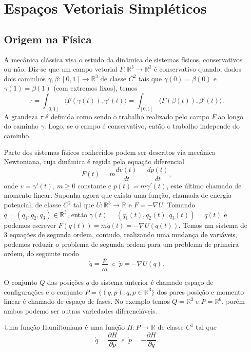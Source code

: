 \documentclass[12pt]{book}
\newcommand{\derivada}[2]{\frac{d #1}{d #2}}
\newcommand{\derivadaparcial}[2]{\frac{\partial #1}{\partial #2}}
\newcommand{\intervalo}{[0,1]}
\newcommand{\produtointerno}[2]{\langle #1, #2 \rangle}
\newcommand{\real}[1]{\mathbb{R}^{#1}}
\newcommand{\reta}{\real{}}
\begin{document}
	
	\chapter{Espaços Vetoriais Simpléticos}\label{capitulo_espacos_vetoriais_simpleticos}
	
	\section{Origem na Física}
	
	A mecânica clássica visa o estudo da dinâmica de sistemas físicos, conservativos ou não. Diz-se que um campo vetorial $F:\real{3} \to \real{3}$ é conservativo quando, dados dois caminhos $\gamma,\beta:[0,1] \to \real{3}$ de classe $C^{2}$ tais que $\gamma(0)=\beta(0)$ e $\gamma(1)=\beta(1)$ (com extremos fixos), temos
	$$
	\tau=\int_{\intervalo} \produtointerno{F(\gamma(t))}{\gamma'(t)}=
	\int_{\intervalo} \produtointerno{F(\beta(t))}{\beta'(t)}.
	$$
	A grandeza $\tau$ é definida como sendo o trabalho realizado pelo campo $F$ ao longo do caminho $\gamma$. Logo, se o campo é conservativo, então o trabalho independe do caminho.
	
	Parte dos sistemas físicos conhecidos podem ser descritos via mecânica Newtoniana, cuja dinâmica é regida pela equação diferencial 
	$$
	F(t) = m\derivada{v(t)}{t} = \derivada{p(t)}{t},
	$$
	onde $v = \gamma'(t)$, $m\geq0$ constante e $p(t) = m\gamma'(t)$, este último chamado de momento linear. Suponha agora que exista uma função, chamada de energia potencial, de classe $C^{2}$ tal que $U:\real{3}\to \reta$ e $F = -\nabla U$. Tomando $q=(q_{1},q_{2}, q_{3})\in \real{3}$, então $\gamma(t)=(q_{1}(t),q_{2}(t), q_{3}(t)) = q(t)$ e podemos escrever $F(q(t)) =m \ddot{q}(t)= -\nabla U(q(t))$. Temos um sistema de 3 equações de segunda ordem, contudo, realizando uma mudança de variáveis, podemos reduzir o problema de segunda ordem para um problema de primeira ordem, do seguinte modo
	$$
	\dot{q} = \frac{p}{m} \;\; e \;\;\dot{p} = -\nabla U(q).
	$$
	
	O conjunto $Q$ das posições $q$ do sistema anterior é chamado espaço de configurações e o conjunto $P=\{(q,p): q,p\in \real{3}\}$ dos pares posição e momento linear é chamado de espaço de fases. No exemplo temos $Q=\real{3}$ e $P = \real{6}$, porém ambos podemo ser outras variedades diferenciáveis.
	
	Uma função Hamiltoniana é uma função $H:P \to \reta$ de classe $C^{1}$ tal que 
	$$
	\dot{q} = \derivadaparcial{H}{p} \;\; e \;\; \dot{p} = -\derivadaparcial{H}{q}.
	$$
	
\end{document}
